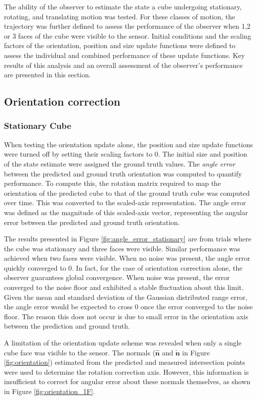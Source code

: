 The ability of the observer to estimate the state a cube undergoing stationary, rotating, and translating motion was tested. For these classes of motion, the trajectory was further defined to assess the performance of the observer when 1,2 or 3 faces of the cube were visible to the sensor. 
Initial conditions and the scaling factors of the orientation, position and size update functions were defined to assess the individual and combined performance of these update functions. 
Key results of this analysis and an overall assessment of the observer's performance are presented in this section.

\subsection{Orientation correction}
\subsubsection{Stationary Cube}
When testing the orientation update alone, the position and size update functions were turned off by setting their scaling factors to 0. The initial size and position of the state estimate were assigned the ground truth values. The \textit{angle error} between the predicted and ground truth orientation was computed to quantify performance. To compute this, the rotation matrix required to map the orientation of the predicted cube to that of the ground truth cube was computed over time. This was converted to the scaled-axis representation. The angle error was defined as the magnitude of this scaled-axis vector, representing the angular error between the predicted and ground truth orientation.

The results presented in Figure \ref{fig:angle_error_stationary} are from trials where the cube was stationary and three faces were visible. Similar performance was achieved when two faces were visible. When no noise was present, the angle error quickly converged to 0. In fact, for the case of orientation correction alone, the observer guarantees global convergence. When noise was present, the error converged to the noise floor and exhibited a stable fluctuation about this limit. Given the mean and standard deviation of the Gaussian distributed range error, the angle error would be expected to cross 0 once the error converged to the noise floor. The reason this does not occur is due to small error in the orientation axis between the prediction and ground truth. 

A limitation of the orientation update scheme was revealed when only a single cube face was visible to the sensor. The normals ($\hat{\mathbf{n}} $ and $\tilde{\mathbf{n}}$ in Figure \ref{fig:orientation}) estimated from the predicted and measured intersection points were used to determine the rotation correction axis. However, this information is insufficient to correct for angular error about these normals themselves, as shown in Figure \ref{fig:orientation_1F}. 

